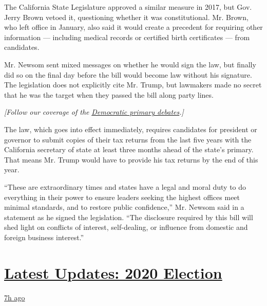 The California State Legislature approved a similar measure in 2017, but
Gov. Jerry Brown vetoed it, questioning whether it was constitutional.
Mr. Brown, who left office in January, also said it would create a
precedent for requiring other information --- including medical records
or certified birth certificates --- from candidates.

Mr. Newsom sent mixed messages on whether he would sign the law, but
finally did so on the final day before the bill would become law without
his signature. The legislation does not explicitly cite Mr. Trump, but
lawmakers made no secret that he was the target when they passed the
bill along party lines.

\emph{{[}Follow our coverage of the}
\href{https://www.nytimes3xbfgragh.onion/2019/07/29/us/politics/democratic-debate-schedule-lineup.html?action=click\&module=Intentional\&pgtype=Article}{\emph{Democratic
primary debates}}\emph{.{]}}

The law, which goes into effect immediately, requires candidates for
president or governor to submit copies of their tax returns from the
last five years with the California secretary of state at least three
months ahead of the state's primary. That means Mr. Trump would have to
provide his tax returns by the end of this year.

``These are extraordinary times and states have a legal and moral duty
to do everything in their power to ensure leaders seeking the highest
offices meet minimal standards, and to restore public confidence,'' Mr.
Newsom said in a statement as he signed the legislation. ``The
disclosure required by this bill will shed light on conflicts of
interest, self-dealing, or influence from domestic and foreign business
interest.''

\hypertarget{latest-updates-2020-election}{%
\section{\texorpdfstring{\href{https://www.nytimes3xbfgragh.onion/live/2020/08/19/us/dnc-convention-election?action=click\&pgtype=Article\&state=default\&region=MAIN_CONTENT_1\&context=storylines_live_updates}{Latest
Updates: 2020
Election}}{Latest Updates: 2020 Election}}\label{latest-updates-2020-election}}

\href{https://www.nytimes3xbfgragh.onion/live/2020/08/19/us/dnc-convention-election?action=click\&pgtype=Article\&state=default\&region=MAIN_CONTENT_1\&context=storylines_live_updates\#night-3-featured-more-policy-a-focus-on-women-and-a-full-throated-rejection-of-trump-by-his-predecessor}{7h
ago}

